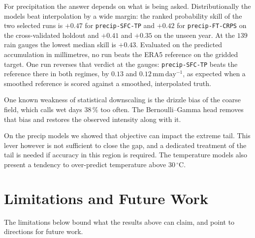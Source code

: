For precipitation the answer depends on what is being asked. Distributionally the models beat
interpolation by a wide margin: the ranked probability skill of the two selected runs is $+0.47$ for \texttt{precip-SFC-TP} and
$+0.42$ for \texttt{precip-FT-CRPS} on the cross-validated holdout and $+0.41$ and $+0.35$ on the unseen year.
At the $139$ rain gauges the lowest median skill is $+0.43$.
Evaluated on the predicted accumulation in millimetres, no run beats
the ERA5 reference on the gridded target. One run reverses that verdict at the gauges:
\texttt{precip-SFC-TP} beats the reference there in both regimes, by $0.13$ and
$0.12\,\mathrm{mm\,day^{-1}}$, as expected when a smoothed reference is scored against a smoothed,
interpolated truth.

One known weakness of statistical downscaling is the drizzle bias of the coarse field, which calls wet days $38\,\%$ too often. The Bernoulli--Gamma head removes that bias and restores the observed intensity along with it. 

On the precip models we showed that objective can impact the extreme tail. This lever however is not sufficient to close the gap, and a dedicated treatment of the tail is needed if accuracy in this region is required. The temperature models also present a tendency to over-predict temperature above $30\,^{\circ}\mathrm{C}$.



\section{Limitations and Future Work}\label{sec:concl-future}

The limitations below bound what the results above can claim, and point to directions for future work.

